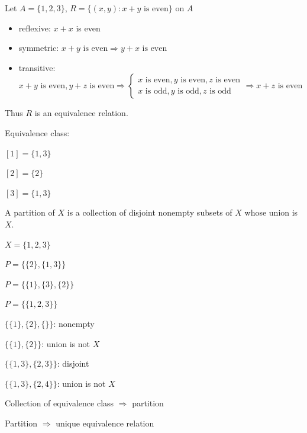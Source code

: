 \documentclass{article}
\begin{document}
\begin{example}
    Let $A = \{1,2,3\}$, $R = \{(x,y) : x + y \text{ is even}\}$ on $A$

    \begin{itemize}
        \item reflexive: $x+x$ is even
        \item symmetric: $x+y \text{ is even} \Rightarrow y+x \text{ is even}$
        \item transitive: $x+y \text{ is even}, y+z \text{ is even} \Rightarrow \begin{cases}
                      x \text{ is even}, y \text{ is even}, z \text{ is even} \\
                      x \text{ is odd}, y \text{ is odd}, z \text{ is odd}
                  \end{cases} \Rightarrow x+z \text{ is even}$
    \end{itemize}

    Thus $R$ is an equivalence relation.

    Equivalence class:

    $[1] = \{1,3\}$

    $[2] = \{2\}$

    $[3] = \{1,3\}$
\end{example}

\begin{definition}
    A partition of $X$ is a collection of disjoint nonempty subsets of $X$ whose union is $X$.
\end{definition}

\begin{example}
    $X = \{1,2,3\}$

    $P = \{\{2\},\{1,3\}\}$

    $P = \{\{1\},\{3\},\{2\}\}$

    $P = \{\{1,2,3\}\}$

    $\{\{1\},\{2\},\{\}\}$: nonempty

    $\{\{1\},\{2\}\}$: union is not $X$

    $\{\{1,3\},\{2,3\}\}$: disjoint

    $\{\{1,3\},\{2,4\}\}$: union is not $X$
\end{example}

\begin{exercise}
    Collection of equivalence class $\Rightarrow$ partition

    Partition $\Rightarrow$ unique equivalence relation
\end{exercise}
\end{document}
